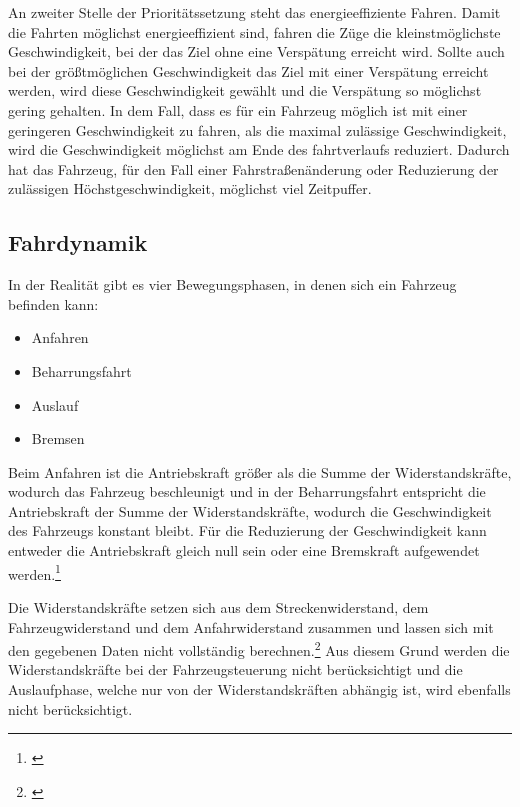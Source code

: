 An zweiter Stelle der Prioritätssetzung steht das energieeffiziente Fahren. Damit die Fahrten möglichst energieeffizient sind, fahren die Züge die kleinstmöglichste Geschwindigkeit, bei der das Ziel ohne eine Verspätung erreicht wird. Sollte auch bei der größtmöglichen Geschwindigkeit das Ziel mit einer Verspätung erreicht werden, wird diese Geschwindigkeit gewählt und die Verspätung so möglichst gering gehalten. In dem Fall, dass es für ein Fahrzeug möglich ist mit einer geringeren Geschwindigkeit zu fahren, als die maximal zulässige Geschwindigkeit, wird die Geschwindigkeit möglichst am Ende des \gls{fahrtverlauf}s reduziert. Dadurch hat das Fahrzeug, für den Fall einer Fahrstraßenänderung oder Reduzierung der zulässigen Höchstgeschwindigkeit, möglichst viel Zeitpuffer.
\newpage
\subsection{Fahrdynamik}
In der Realität gibt es vier Bewegungsphasen, in denen sich ein Fahrzeug befinden kann:
\begin{itemize}
\item Anfahren
\item Beharrungsfahrt
\item Auslauf
\item Bremsen
\end{itemize}
Beim Anfahren ist die Antriebskraft größer als die Summe der Widerstandskräfte, wodurch das Fahrzeug beschleunigt und in der Beharrungsfahrt entspricht die Antriebskraft der Summe der Widerstandskräfte, wodurch die Geschwindigkeit des Fahrzeugs konstant bleibt. Für die Reduzierung der Geschwindigkeit kann entweder die Antriebskraft gleich null sein oder eine Bremskraft aufgewendet werden.\footnote{\citet[S. 23 ff.]{pachl1999systemtechnik}}

Die Widerstandskräfte setzen sich aus dem Streckenwiderstand, dem Fahrzeugwiderstand und dem Anfahrwiderstand zusammen und lassen sich mit den gegebenen Daten nicht vollständig berechnen.\footnote{\citet[S. 25 ff.]{pachl1999systemtechnik}} Aus diesem Grund werden die Widerstandskräfte bei der Fahrzeugsteuerung nicht berücksichtigt und die Auslaufphase, welche nur von der Widerstandskräften abhängig ist, wird ebenfalls nicht berücksichtigt.
